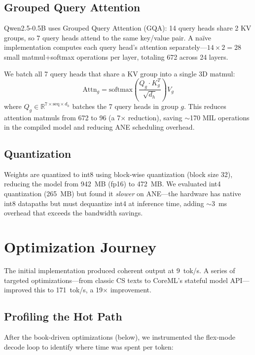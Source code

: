 \documentclass[11pt,twocolumn]{article}
\begin{document}
\subsection{Grouped Query Attention}

Qwen2.5-0.5B uses Grouped Query Attention (GQA): 14 query heads
share 2 KV groups, so 7 query heads attend to the same key/value
pair.  A na\"ive implementation computes each query head's attention
separately---$14 \times 2 = 28$ small matmul+softmax operations per
layer, totaling 672 across 24 layers.

We batch all 7 query heads that share a KV group into a single
3D matmul:
\begin{equation}
\text{Attn}_g = \text{softmax}\!\left(\frac{Q_g \cdot K_g^T}{\sqrt{d_h}}\right) V_g
\end{equation}
where $Q_g \in \mathbb{R}^{7 \times \text{seq} \times d_h}$ batches
the 7 query heads in group $g$.  This reduces attention matmuls from
672 to 96 (a 7$\times$ reduction), saving $\sim$170 MIL operations
in the compiled model and reducing ANE scheduling overhead.

\subsection{Quantization}

Weights are quantized to int8 using block-wise quantization (block
size 32), reducing the model from 942~MB (fp16) to 472~MB.  We
evaluated int4 quantization (265~MB) but found it \emph{slower} on
ANE---the hardware has native int8 datapaths but must dequantize int4
at inference time, adding $\sim$3~ms overhead that exceeds the
bandwidth savings.


\section{Optimization Journey}
\label{sec:opt}

The initial implementation produced coherent output at 9~tok/s. A
series of targeted optimizations---from classic CS texts to CoreML's
stateful model API---improved this to 171~tok/s, a 19$\times$
improvement.

\subsection{Profiling the Hot Path}

After the book-driven optimizations (below), we instrumented the
flex-mode decode loop to identify where time was spent per token:
\end{document}
